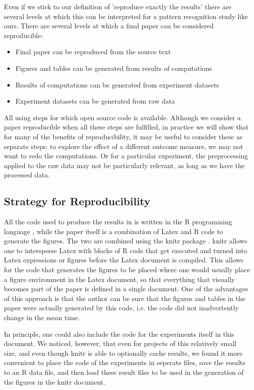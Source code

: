 \documentclass[runningheads,a4paper]{llncs}\usepackage[]{graphicx}\usepackage[]{color}
\begin{document}
Even if we stick to our definition of 'reproduce exactly the results' there are several levels at which this can be interpreted for a pattern recognition study like ours. There are several levels at which a final paper can be considered reproducible:
\begin{itemize}
\item Final paper can be reproduced from the source text
\item Figures and tables can be generated from results of computations
\item Results of computations can be generated from experiment datasets
\item Experiment datasets can be generated from raw data 
\end{itemize}
All using steps for which open source code is available. Although we consider a paper reproducible when all these steps are fulfilled, in practice we will show that for many of the benefits of reproducibility, it may be useful to consider these as separate steps: to explore the effect of a different outcome measure, we may not want to redo the computations. Or for a particular experiment, the preprocessing applied to the raw data may not be particularly relevant, as long as we have the processed data.

\subsection{Strategy for Reproducibility}
All the code used to produce the results in \cite{Krijthe2016a} is written in the R programming language \cite{RCoreTeam2016}, while the paper itself is a combination of Latex and R code to generate the figures. The two are combined using the knitr package \cite{Xie2014}. knitr allows one to intersperse Latex with blocks of R code that get executed and turned into Latex expressions or figures before the Latex document is compiled. This allows for the code that generates the figures to be placed where one would usually place a figure environment in the Latex document, so that everything that visually becomes part of the paper is defined in a single document. One of the advantages of this approach is that the author can be sure that the figures and tables in the paper were actually generated by this code, i.e. the code did not inadvertently change in the mean time.

In principle, one could also include the code for the experiments itself in this document. We noticed, however, that even for projects of this relatively small size, and even though knitr is able to optionally cache results, we found it more convenient to place the code of the experiments in seperate files, save the results to an R data file, and then load these result files to be used in the generation of the figures in the knitr document.
\end{document}
